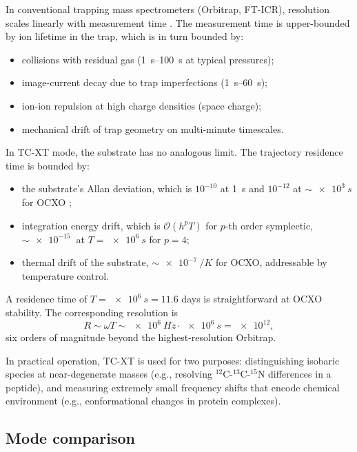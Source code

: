 \documentclass[twocolumn,11pt,a4paper]{article}
\theoremstyle{definition}
\theoremstyle{remark}
\begin{document}
In conventional trapping mass spectrometers (Orbitrap, FT-ICR), resolution scales linearly with measurement time \citep{makarov2006,denisov2012}. The measurement time is upper-bounded by ion lifetime in the trap, which is in turn bounded by:
\begin{itemize}[nosep]
    \item collisions with residual gas (\SIrange{1}{100}{s} at typical pressures);
    \item image-current decay due to trap imperfections (\SIrange{1}{60}{s});
    \item ion-ion repulsion at high charge densities (space charge);
    \item mechanical drift of trap geometry on multi-minute timescales.
\end{itemize}

In TC-XT mode, the substrate has no analogous limit. The trajectory residence time is bounded by:
\begin{itemize}[nosep]
    \item the substrate's Allan deviation, which is $10^{-10}$ at \SI{1}{s} and $10^{-12}$ at $\sim\SI{e3}{s}$ for OCXO \citep{vig1999};
    \item integration energy drift, which is $\mathcal{O}(h^p T)$ for $p$-th order symplectic, $\sim\SI{e-15}{}$ at $T = \SI{e6}{s}$ for $p = 4$;
    \item thermal drift of the substrate, $\sim\SI{e-7}{/K}$ for OCXO, addressable by temperature control.
\end{itemize}

A residence time of $T = \SI{e6}{s} = 11.6$ days is straightforward at OCXO stability. The corresponding resolution is
\begin{equation}
    R \sim \omega T \sim \SI{e6}{Hz} \cdot \SI{e6}{s} = \num{e12},
\end{equation}
six orders of magnitude beyond the highest-resolution Orbitrap.

In practical operation, TC-XT is used for two purposes: distinguishing isobaric species at near-degenerate masses (e.g., resolving $^{12}$C-$^{13}$C-$^{15}$N differences in a peptide), and measuring extremely small frequency shifts that encode chemical environment (e.g., conformational changes in protein complexes).

\subsection{Mode comparison}
\end{document}
